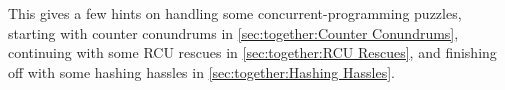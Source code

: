
%


This 
gives a few hints on handling some concurrent-programming
puzzles, starting with counter conundrums in
\cref{sec:together:Counter Conundrums},
continuing with some RCU rescues in
\cref{sec:together:RCU Rescues},
and finishing off with some hashing hassles in
\cref{sec:together:Hashing Hassles}.





